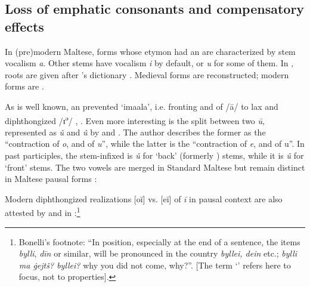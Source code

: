 \documentclass[output=paper]{langsci/langscibook}
\begin{document}
\subsection{Loss of emphatic consonants and compensatory effects}

In (pre)modern Maltese, forms whose  etymon had an  are characterized by stem vocalism \textit{a}. Other stems have vocalism \textit{i} by default, or \textit{u} for some of them. In ,  roots are given after \citeauthor{Aquilina1987}'s dictionary \citep{Aquilina1987,Aquilina1990}. Medieval forms are reconstructed; modern forms are .


As is well known, an  prevented ‘imaala’, i.e. fronting and  of /ā/ to lax and diphthongized /ɪ\textsuperscript{ə}/ \citep{Cowan1966,Borg1976}, \citep[271]{Borg1997}. Even more interesting is the split between two \textit{ū}, represented as \textit{ǔ} and \textit{û} by \citet[XVIII]{Vassalli1796} and \citet[11]{Vassalli1827}. The author describes the former as the “contraction of \textit{o}, and of \textit{u}”, while the latter is the “contraction of \textit{e}, and of u”. In past participles, the stem-infixed  is \textit{ǔ} for ‘back’ (formerly ) stems, while it is \textit{û} for ‘front’ stems. The two vowels are merged in Standard Maltese but remain distinct in  Maltese pausal forms \citep{Borg1977}:


  
Modern  diphthongized realizations [oĭ] vs. [eĭ] of \textit{ī} in pausal context are also attested by \citet[11]{Vassalli1827} and in \citet[vol. IV, 97]{Bonelli1897}:\footnote{Bonelli's footnote: “In  position, especially at the end of a sentence, the items \textit{bylli}, \textit{dīn} or similar, will be pronounced in the country \textit{byllei, dein} etc.; \textit{bylli ma \.gejtš? byllei?} why you did not come, why?”. [The term ‘' refers here to  focus, not to  properties].}
\end{document}
